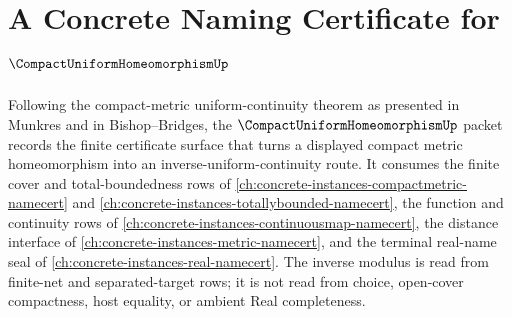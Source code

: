 \chapter{A Concrete Naming Certificate for $\CompactUniformHomeomorphismUp$}
\label{ch:concrete-instances-compact-uniform-homeomorphism-namecert}

Following the compact-metric uniform-continuity theorem as presented in Munkres and in Bishop--Bridges, the $\CompactUniformHomeomorphismUp$ packet records the finite certificate surface that turns a displayed compact metric homeomorphism into an inverse-uniform-continuity route. It consumes the finite cover and total-boundedness rows of \autoref{ch:concrete-instances-compactmetric-namecert} and \autoref{ch:concrete-instances-totallybounded-namecert}, the function and continuity rows of \autoref{ch:concrete-instances-continuousmap-namecert}, the distance interface of \autoref{ch:concrete-instances-metric-namecert}, and the terminal real-name seal of \autoref{ch:concrete-instances-real-namecert}. The inverse modulus is read from finite-net and separated-target rows; it is not read from choice, open-cover compactness, host equality, or ambient Real completeness.

